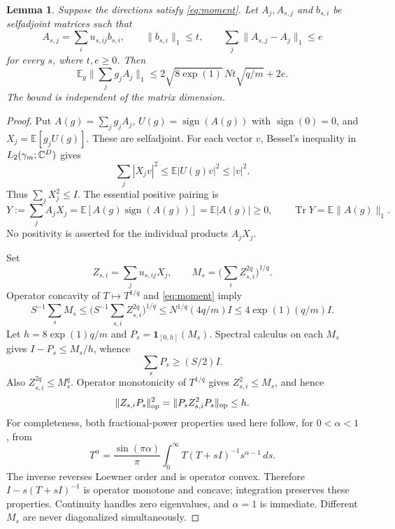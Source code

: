 \documentclass[11pt]{article}
\newtheorem{lemma}[theorem]{Lemma}
\theoremstyle{remark}\newtheorem{remark}[theorem]{Remark}
\numberwithin{equation}{section}
\newcommand{\E}{\mathbb E}\newcommand{\Prob}{\mathbb P}
\DeclareMathOperator{\Tr}{Tr}\DeclareMathOperator{\TV}{TV}
\DeclareMathOperator{\sgn}{sign}\DeclareMathOperator{\diam}{diam}
\newcommand{\norm}[1]{\lVert #1\rVert}
\begin{document}
\begin{lemma}\label{lem:selector}
Suppose the directions satisfy \eqref{eq:moment}. Let $A_j,A_{s,j}$ and
$b_{s,i}$ be selfadjoint matrices such that
\[
 A_{s,j}=\sum_i u_{s,ij}b_{s,i},\qquad
 \norm{b_{s,i}}_1\le t,\qquad
 \sum_j\norm{A_{s,j}-A_j}_1\le e
\]
for every $s$, where $t,e\ge0$. Then
\begin{equation}\label{eq:selector}
 \E_g\norm{\sum_jg_jA_j}_1
 \le 2\sqrt{8\exp(1)}\,Nt\sqrt{q/m}+2e.
\end{equation}
The bound is independent of the matrix dimension.
\end{lemma}
\begin{proof}
Put $A(g)=\sum_jg_jA_j$, $U(g)=\sgn(A(g))$ with $\sgn(0)=0$, and
$X_j=\E[g_jU(g)]$. These are selfadjoint. For each vector $v$, Bessel's
inequality in $L_2(\gamma_m;\mathbb C^D)$ gives
\[
 \sum_j|X_jv|^2\le\E|U(g)v|^2\le|v|^2.
\]
Thus $\sum_jX_j^2\le I$. The essential positive pairing is
\begin{equation}\label{eq:positive}
 Y:=\sum_jA_jX_j=\E[A(g)\sgn(A(g))]=\E|A(g)|\ge0,
 \qquad \Tr Y=\E\norm{A(g)}_1.
\end{equation}
No positivity is asserted for the individual products $A_jX_j$.

Set
\[
 Z_{s,i}=\sum_j u_{s,ij}X_j,\qquad
 M_s=\Big(\sum_iZ_{s,i}^{2q}\Big)^{1/q}.
\]
Operator concavity of $T\mapsto T^{1/q}$ and \eqref{eq:moment} imply
\[
 S^{-1}\sum_s M_s
 \le\Big(S^{-1}\sum_{s,i}Z_{s,i}^{2q}\Big)^{1/q}
 \le N^{1/q}(4q/m)I\le4\exp(1)(q/m)I.
\]
Let $h=8\exp(1)q/m$ and $P_s=\mathbf1_{[0,h]}(M_s)$. Spectral calculus
on each $M_s$ gives $I-P_s\le M_s/h$, whence
\begin{equation}\label{eq:coverage}
 \sum_sP_s\ge(S/2)I.
\end{equation}
Also $Z_{s,i}^{2q}\le M_s^q$. Operator monotonicity of $T^{1/q}$ gives
$Z_{s,i}^2\le M_s$, and hence
\begin{equation}\label{eq:compression}
 \norm{Z_{s,i}P_s}_{\op}^2
 =\norm{P_sZ_{s,i}^2P_s}_{\op}\le h.
\end{equation}
For completeness, both fractional-power properties used here follow, for
$0<\alpha<1$, from
\[
 T^\alpha=\frac{\sin(\pi\alpha)}\pi
     \int_0^\infty T(T+sI)^{-1}s^{\alpha-1}\,ds.
\]
The inverse reverses Loewner order and is operator convex. Therefore
$I-s(T+sI)^{-1}$ is operator monotone and concave; integration preserves
these properties. Continuity handles zero eigenvalues, and $\alpha=1$
is immediate. Different $M_s$ are never diagonalized simultaneously.


\end{proof}
\end{document}
